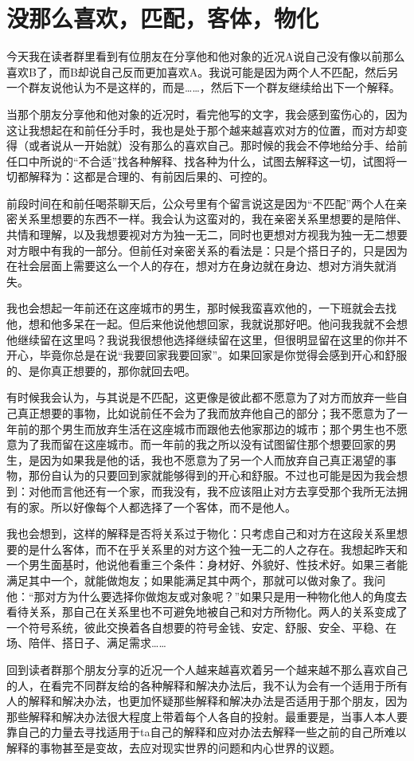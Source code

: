 \chapter{没那么喜欢，匹配，客体，物化}





今天我在读者群里看到有位朋友在分享他和他对象的近况\pozhehao{}A说自己没有像以前那么喜欢B了，而B却说自己反而更加喜欢A。我说可能是因为两个人不匹配，然后另一个群友说他认为不是这样的，而是……，然后下一个群友继续给出下一个解释。

当那个朋友分享他和他对象的近况时，看完他写的文字，我会感到蛮伤心的，因为这让我想起在和前任分手时，我也是处于那个越来越喜欢对方的位置，而对方却变得（或者说从一开始就）没有那么的喜欢自己。那时候的我会不停地给分手、给前任口中所说的“不合适”找各种解释、找各种为什么，试图去解释这一切，试图将一切都解释为：这都是合理的、有前因后果的、可控的。

前段时间在和前任喝茶聊天后，公众号里有个留言说这是因为“不匹配”\pozhehao{}两个人在亲密关系里想要的东西不一样。我会认为这蛮对的，我在亲密关系里想要的是陪伴、共情和理解，以及我想要视对方为独一无二，同时也更想对方视我为独一无二\pozhehao{}想要对方眼中有我的一部分。但前任对亲密关系的看法是：只是个搭日子的，只是因为在社会层面上需要这么一个人的存在，想对方在身边就在身边、想对方消失就消失。

我也会想起一年前还在这座城市的男生，那时候我蛮喜欢他的，一下班就会去找他，想和他多呆在一起。但后来他说他想回家，我就说那好吧。他问我我就不会想他继续留在这里吗？我说我很想他选择继续留在这里，但很明显留在这里的你并不开心，毕竟你总是在说“我要回家我要回家”。如果回家是你觉得会感到开心和舒服的、是你真正想要的，那你就回去吧。

有时候我会认为，与其说是不匹配，这更像是彼此都不愿意为了对方而放弃一些自己真正想要的事物，比如说前任不会为了我而放弃他自己的部分；我不愿意为了一年前的那个男生而放弃生活在这座城市而跟他去他家那边的城市；那个男生也不愿意为了我而留在这座城市。而一年前的我之所以没有试图留住那个想要回家的男生，是因为如果我是他的话，我也不愿意为了另一个人而放弃自己真正渴望的事物，那份自认为的只要回到家就能够得到的开心和舒服。不过也可能是因为我会想到：对他而言他还有一个家，而我没有，我不应该阻止对方去享受那个我所无法拥有的家。所以好像每个人都选择了一个客体，而不是他人。

我也会想到，这样的解释是否将关系过于物化：只考虑自己和对方在这段关系里想要的是什么客体，而不在乎关系里的对方这个独一无二的人之存在。我想起昨天和一个男生面基时，他说他看重三个条件：身材好、外貌好、性技术好。如果三者能满足其中一个，就能做炮友；如果能满足其中两个，那就可以做对象了。我问他：“那对方为什么要选择你做炮友或对象呢？”如果只是用一种物化他人的角度去看待关系，那自己在关系里也不可避免地被自己和对方所物化。两人的关系变成了一个符号系统，彼此交换着各自想要的符号\pozhehao{}金钱、安定、舒服、安全、平稳、在场、陪伴、搭日子、满足需求……

回到读者群那个朋友分享的近况\pozhehao{}一个人越来越喜欢着另一个越来越不那么喜欢自己的人，在看完不同群友给的各种解释和解决办法后，我不认为会有一个适用于所有人的解释和解决办法，也更加怀疑那些解释和解决办法是否适用于那个朋友，因为那些解释和解决办法很大程度上带着每个人各自的投射。最重要是，当事人本人要靠自己的力量去寻找适用于ta自己的解释和应对办法\pozhehao{}去解释一些之前的自己所难以解释的事物甚至是变故，去应对现实世界的问题和内心世界的议题。

